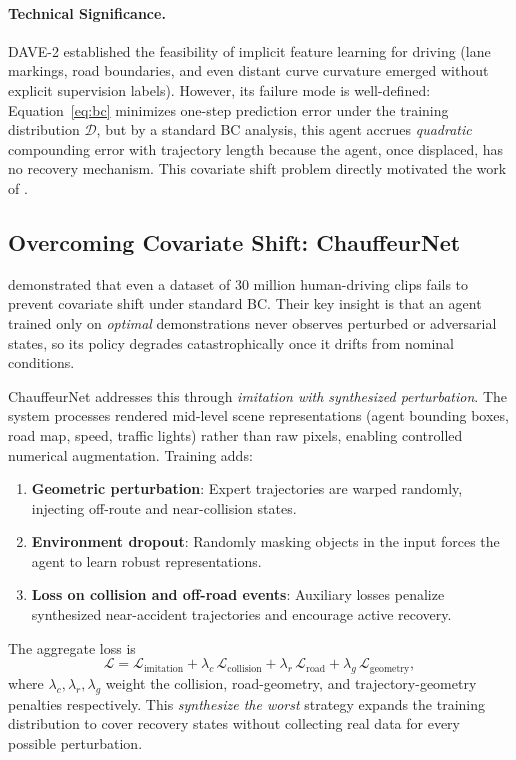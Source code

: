 \documentclass[12pt, a4paper]{article}
\begin{document}
\paragraph{Technical Significance.}
DAVE-2 established the feasibility of implicit feature learning for driving (lane
markings, road boundaries, and even distant curve curvature emerged without
explicit supervision labels). However, its failure mode is well-defined:
Equation~\eqref{eq:bc} minimizes one-step prediction error under the training
distribution $\mathcal{D}$, but by a standard BC analysis, this agent
accrues \emph{quadratic} compounding error with trajectory length because the
agent, once displaced, has no recovery mechanism. This covariate shift problem
directly motivated the work of \citet{bansal2018chauffeur}.

\subsection{Overcoming Covariate Shift: ChauffeurNet}
\label{sec:chauffeur}

\citet{bansal2018chauffeur} demonstrated that even a dataset of 30 million
human-driving clips fails to prevent covariate shift under standard BC. Their key
insight is that an agent trained only on \emph{optimal} demonstrations never
observes perturbed or adversarial states, so its policy degrades catastrophically
once it drifts from nominal conditions.

ChauffeurNet addresses this through \emph{imitation with synthesized perturbation}.
The system processes rendered mid-level scene representations (agent bounding
boxes, road map, speed, traffic lights) rather than raw pixels, enabling controlled
numerical augmentation. Training adds:
\begin{enumerate}[noitemsep]
  \item \textbf{Geometric perturbation}: Expert trajectories are warped
        randomly, injecting off-route and near-collision states.
  \item \textbf{Environment dropout}: Randomly masking objects in the input forces
        the agent to learn robust representations.
  \item \textbf{Loss on collision and off-road events}: Auxiliary losses penalize
        synthesized near-accident trajectories and encourage active recovery.
\end{enumerate}
The aggregate loss is
\begin{equation}
  \mathcal{L} = \mathcal{L}_{\text{imitation}}
              + \lambda_c\,\mathcal{L}_{\text{collision}}
              + \lambda_r\,\mathcal{L}_{\text{road}}
              + \lambda_g\,\mathcal{L}_{\text{geometry}},
\end{equation}
where $\lambda_c, \lambda_r, \lambda_g$ weight the collision, road-geometry, and
trajectory-geometry penalties respectively. This \emph{synthesize the worst}
strategy expands the training distribution to cover recovery states without
collecting real data for every possible perturbation.
\end{document}
